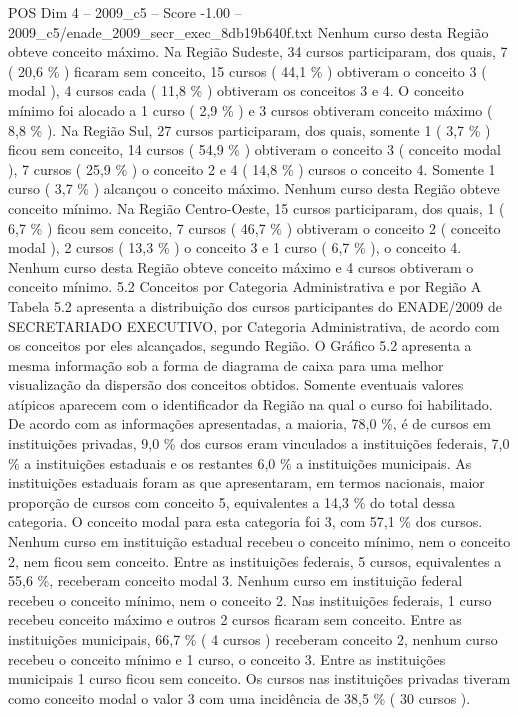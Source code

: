 \begin{textsample}{POS Dim 4 – 2009\_c5 – Score -1.00 – 2009\_c5/enade\_2009\_secr\_exec\_8db19b640f.txt}
Nenhum curso desta Região obteve conceito máximo.
Na Região Sudeste, 34 cursos participaram, dos quais, 7 ( 20,6 \% ) ficaram sem conceito, 15 cursos ( 44,1 \% ) obtiveram o conceito 3 ( modal ), 4 cursos cada ( 11,8 \% ) obtiveram os conceitos 3 e 4.
O conceito mínimo foi alocado a 1 curso ( 2,9 \% ) e 3 cursos obtiveram conceito máximo ( 8,8 \% ).
Na Região Sul, 27 cursos participaram, dos quais, somente 1 ( 3,7 \% ) ficou sem conceito, 14 cursos ( 54,9 \% ) obtiveram o conceito 3 ( conceito modal ), 7 cursos ( 25,9 \% ) o conceito 2 e 4 ( 14,8 \% ) cursos o conceito 4.
Somente 1 curso ( 3,7 \% ) alcançou o conceito máximo.
Nenhum curso desta Região obteve conceito mínimo.
Na Região Centro-Oeste, 15 cursos participaram, dos quais, 1 ( 6,7 \% ) ficou sem conceito, 7 cursos ( 46,7 \% ) obtiveram o conceito 2 ( conceito modal ), 2 cursos ( 13,3 \% ) o conceito 3 e 1 curso ( 6,7 \% ), o conceito 4.
Nenhum curso desta Região obteve conceito máximo e 4 cursos obtiveram o conceito mínimo. 5.2 Conceitos por Categoria Administrativa e por Região A Tabela 5.2 apresenta a distribuição dos cursos participantes do ENADE/2009 de SECRETARIADO EXECUTIVO, por Categoria Administrativa, de acordo com os conceitos por eles alcançados, segundo Região.
O Gráfico 5.2 apresenta a mesma informação sob a forma de diagrama de caixa para uma melhor visualização da dispersão dos conceitos obtidos.
Somente eventuais valores atípicos aparecem com o identificador da Região na qual o curso foi habilitado.
De acordo com as informações apresentadas, a maioria, 78,0 \%, é de cursos em instituições privadas, 9,0 \% dos cursos eram vinculados a instituições federais, 7,0 \% a instituições estaduais e os restantes 6,0 \% a instituições municipais.
As instituições estaduais foram as que apresentaram, em termos nacionais, maior proporção de cursos com conceito 5, equivalentes a 14,3 \% do total dessa categoria.
O conceito modal para esta categoria foi 3, com 57,1 \% dos cursos.
Nenhum curso em instituição estadual recebeu o conceito mínimo, nem o conceito 2, nem ficou sem conceito.
Entre as instituições federais, 5 cursos, equivalentes a 55,6 \%, receberam conceito modal 3.
Nenhum curso em instituição federal recebeu o conceito mínimo, nem o conceito 2.
Nas instituições federais, 1 curso recebeu conceito máximo e outros 2 cursos ficaram sem conceito.
Entre as instituições municipais, 66,7 \% ( 4 cursos ) receberam conceito 2, nenhum curso recebeu o conceito mínimo e 1 curso, o conceito 3.
Entre as instituições municipais 1 curso ficou sem conceito.
Os cursos nas instituições privadas tiveram como conceito modal o valor 3 com uma incidência de 38,5 \% ( 30 cursos ).

\end{textsample}
